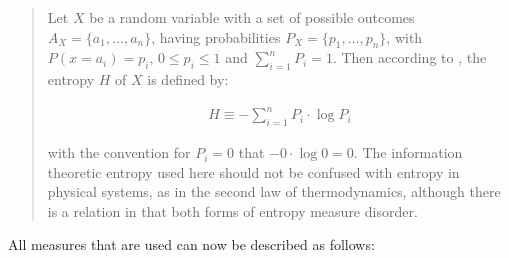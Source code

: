\begin{quote}
Let $X$ be a random variable with a set of possible outcomes $A_X=\{a_1,\ldots,a_n\}$, having probabilities $P_X=\{p_1,\ldots,p_n\}$, with $P(x=a_i)=p_i$, $0 \leq p_i \leq 1$ and $\sum_{i=1}^n P_i = 1$. Then according to \citep{shannon:1948}, the entropy $H$ of $X$ is defined by:

\begin{eqnarray}
H \equiv -\sum_{i=1}^n P_i \cdot \log P_i
\end{eqnarray}


with the convention for $P_i=0$ that $-0 \cdot \log 0 = 0$. The information theoretic entropy used here should not be confused with entropy in physical systems, as in the second law of thermodynamics, although there is a relation in that both forms of entropy measure disorder. \cite[p. 76]{dejong:2000}
\end{quote}


All measures that are used can now be described as follows:

